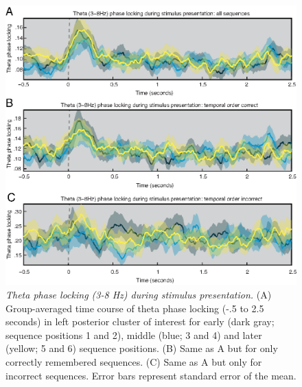 \begin{figure}
  \centering
  \includegraphics[width=\textwidth]{figures/chapter3_suppfigure8.eps}
  \caption[Theta phase locking during stimulus presentation.]{\textit{Theta phase locking (3-8 Hz) during stimulus presentation.} (A) Group-averaged time course of theta phase locking (-.5 to 2.5 seconds) in left posterior cluster of interest for early (dark gray; sequence positions 1 and 2), middle (blue; 3 and 4) and later (yellow; 5 and 6) sequence positions. (B) Same as A but for only correctly remembered sequences. (C) Same as A but only for incorrect sequences.  Error bars represent standard error of the mean.}
  \label{chapter3_suppfigure8}
\end{figure}

